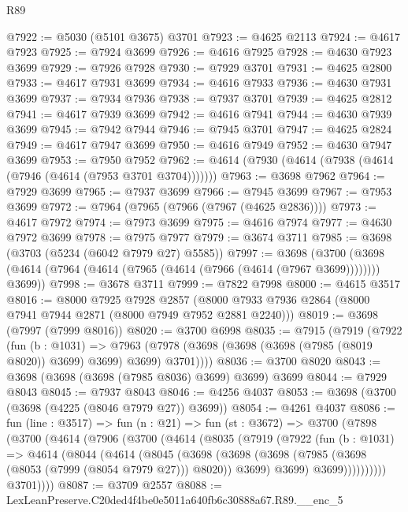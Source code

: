 \begin{lexlean}{R89}
\begin{coremodule}
@7922 := @5030 (@5101 @3675) @3701
@7923 := @4625 @2113
@7924 := @4617 @7923
@7925 := @7924 @3699
@7926 := @4616 @7925
@7928 := @4630 @7923 @3699
@7929 := @7926 @7928
@7930 := @7929 @3701
@7931 := @4625 @2800
@7933 := @4617 @7931 @3699
@7934 := @4616 @7933
@7936 := @4630 @7931 @3699
@7937 := @7934 @7936
@7938 := @7937 @3701
@7939 := @4625 @2812
@7941 := @4617 @7939 @3699
@7942 := @4616 @7941
@7944 := @4630 @7939 @3699
@7945 := @7942 @7944
@7946 := @7945 @3701
@7947 := @4625 @2824
@7949 := @4617 @7947 @3699
@7950 := @4616 @7949
@7952 := @4630 @7947 @3699
@7953 := @7950 @7952
@7962 := @4614 (@7930 (@4614 (@7938 (@4614 (@7946 (@4614 (@7953 @3701 @3704)))))))
@7963 := @3698 @7962
@7964 := @7929 @3699
@7965 := @7937 @3699
@7966 := @7945 @3699
@7967 := @7953 @3699
@7972 := @7964 (@7965 (@7966 (@7967 (@4625 @2836))))
@7973 := @4617 @7972
@7974 := @7973 @3699
@7975 := @4616 @7974
@7977 := @4630 @7972 @3699
@7978 := @7975 @7977
@7979 := @3674 @3711
@7985 := @3698 (@3703 (@5234 (@6042 @7979 @27) @5585))
@7997 := @3698
    (@3700 (@3698 (@4614 (@7964 (@4614 (@7965 (@4614 (@7966 (@4614 (@7967 @3699)))))))) @3699))
@7998 := @3678 @3711
@7999 := @7822 @7998
@8000 := @4615 @3517
@8016 := @8000
    @7925
    @7928
    @2857
    (@8000 @7933 @7936 @2864 (@8000 @7941 @7944 @2871 (@8000 @7949 @7952 @2881 @2240)))
@8019 := @3698 (@7997 (@7999 @8016))
@8020 := @3700 @6998
@8035 := @7915
    (@7919
      (@7922
        (fun (b : @1031) =>
        @7963 (@7978 (@3698 (@3698 (@3698 (@7985 (@8019 @8020)) @3699) @3699) @3699) @3701))))
@8036 := @3700 @8020
@8043 := @3698 (@3698 (@3698 (@7985 @8036) @3699) @3699) @3699
@8044 := @7929 @8043
@8045 := @7937 @8043
@8046 := @4256 @4037
@8053 := @3698 (@3700 (@3698 (@4225 (@8046 @7979 @27)) @3699))
@8054 := @4261 @4037
@8086 := fun (line : @3517) =>
  fun (n : @21) =>
  fun (st : @3672) =>
  @3700
    (@7898
      (@3700
        (@4614
          (@7906
            (@3700
              (@4614
                (@8035
                  (@7919
                    (@7922
                      (fun (b : @1031) =>
                      @4614
                        (@8044
                          (@4614
                            (@8045
                              (@3698
                                (@3698
                                  (@3698
                                    (@7985 (@3698 (@8053 (@7999 (@8054 @7979 @27))) @8020))
                                    @3699)
                                  @3699)
                                @3699))))))))))
            @3701))))
@8087 := @3709 @2557
@8088 := LexLeanPreserve.C20ded4f4be0e5011a640fb6c30888a67.R89.__enc_5

\end{coremodule}
\end{lexlean}
